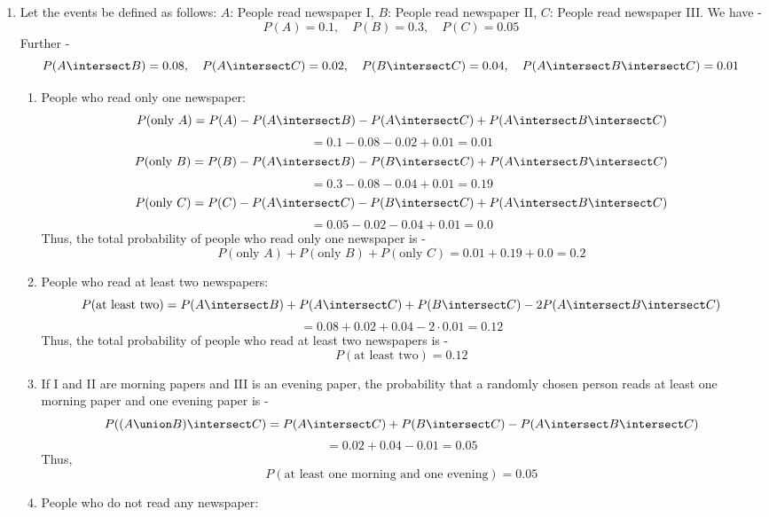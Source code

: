 \begin{enumerate}
    We have - 
    \[P(A) = P(A \intersect B) + P(A \intersect B^C)\]
    Thus,
    \[P(A \intersect B) = P(A) - P(A \intersect B^C) = 0.6 - 0.18 = 0.42\]
    Similarly,
    \[P(B) = P(B \intersect A) + P(B \intersect A^C)\]
    Thus,
    \[P(B \intersect A^C) = P(B) - P(A \intersect B) = 0.7 - 0.42 = 0.28\]
    Therefore, the probability that only one unit meets its objectives is -
    \[\boxed{P(A \intersect B^C) + P(B \intersect A^C) = 0.18 + 0.28 = 0.46}
    \]
    \item Let the events be defined as follows:
    $A$: People read newspaper I, $B$: People read newspaper II, $C$: People read newspaper III. We have - 
    $$P(A) = 0.1, \quad P(B) = 0.3, \quad P(C) = 0.05$$
    Further - 
    $$P(A \intersect B) = 0.08, \quad P(A \intersect C) = 0.02, \quad P(B \intersect C) = 0.04, \quad P(A \intersect B \intersect C) = 0.01$$
    \begin{enumerate}
        \item People who read only one newspaper:
        \[P(\text{only } A) = P(A) - P(A \intersect B) - P(A \intersect C) + P(A \intersect B \intersect C)\]
        \[= 0.1 - 0.08 - 0.02 + 0.01 = 0.01\]
        \[P(\text{only } B) = P(B) - P(A \intersect B) - P(B \intersect C) + P(A \intersect B \intersect C)\]
        \[= 0.3 - 0.08 - 0.04 + 0.01 = 0.19\]
        \[P(\text{only } C) = P(C) - P(A \intersect C) - P(B \intersect C) + P(A \intersect B \intersect C)\]
        \[= 0.05 - 0.02 - 0.04 + 0.01 = 0.0\]
        Thus, the total probability of people who read only one newspaper is -
        \[\boxed{P(\text{only } A) + P(\text{only } B) + P(\text{only } C) = 0.01 + 0.19 + 0.0 = 0.2}
        \]
        \item People who read at least two newspapers:
        \[P(\text{at least two}) = P(A \intersect B) + P(A \intersect C) + P(B \intersect C) - 2P(A \intersect B \intersect C)\]
        \[= 0.08 + 0.02 + 0.04 - 2\cdot 0.01 = 0.12\]
        Thus, the total probability of people who read at least two newspapers is -
        \[\boxed{P(\text{at least two}) = 0.12}
        \]
        \item If I and II are morning papers and III is an evening paper, the probability that a randomly chosen person reads at least one morning paper and one evening paper is -
        \[P((A \union B) \intersect C) = P(A \intersect C) + P(B \intersect C) - P(A \intersect B \intersect C)\]
        \[= 0.02 + 0.04 - 0.01 = 0.05\]
        Thus,
        \[\boxed{P(\text{at least one morning and one evening}) = 0.05}
        \]
        \item People who do not read any newspaper:

\end{enumerate}
\end{enumerate}
